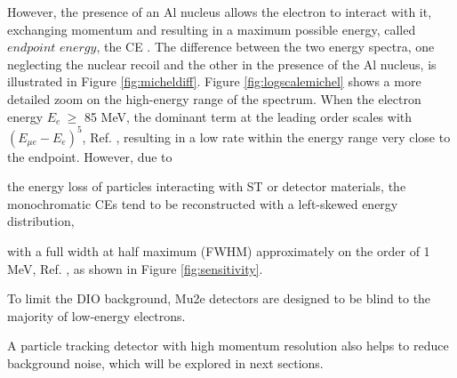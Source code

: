 
However, the presence of an Al nucleus allows the electron to 
interact with it, exchanging momentum and resulting in a maximum possible energy, called 
$endpoint$ $energy$,  the CE .
The difference between the two energy spectra, one 
neglecting the nuclear recoil and the 
other in the presence of the Al nucleus, is illustrated in Figure \ref{fig:micheldiff}. 
Figure \ref{fig:logscalemichel} shows a more detailed zoom on the high-energy 
range of the spectrum. When the electron energy $E_e \ \geq$ 85 MeV, the dominant term 
at the leading order scales with $(E_{\mu e} - E_e)^5$, Ref. \cite{PhysRevD.84.013006}, 
resulting in a low rate within the energy range very close to the endpoint. However,
 due to 

the energy  loss of particles  interacting with ST or detector materials,
the {\red monochromatic CEs} tend to be reconstructed with a left-skewed energy distribution,

with a full width at half maximum (FWHM) approximately on the order of 1 MeV, Ref. 
\cite{gaponenko}, as shown in Figure \ref{fig:sensitivity}.

{\red To limit the DIO background, Mu2e detectors are 
designed to be blind to the majority of low-energy electrons.}

{\red A particle 
tracking detector with high momentum resolution also helps to reduce background 
noise, which will be explored in next sections.}


